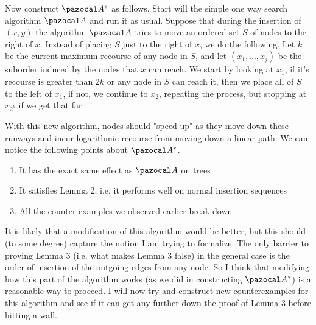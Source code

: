 \documentclass{article}
\begin{document}
Now construct $\pazocal A^*$ as follows. Start will the simple one way search algorithm $\pazocal A$ and run it as usual. Suppose that during the insertion of $(x,y)$ the algorithm $\pazocal A$ tries to move an ordered set $S$ of nodes to the right of $x$. Instead of placing $S$ just to the right of $x$, we do the following. Let $k$ be the current maximum recourse of any node in $S$, and let $(x_1,...,x_j)$ be the suborder induced by the nodes that $x$ can reach. We start by looking at $x_1$, if it's recourse is greater than $2k$ or any node in $S$ can reach it, then we place all of $S$ to the left of $x_1$, if not, we continue to $x_2$, repeating the process, but stopping at $x_{2^k}$ if we get that far.

With this new algorithm, nodes should "speed up" as they move down these runways and incur logarithmic recourse from moving down a linear path. We can notice the following points about $\pazocal A^*$.

\begin{enumerate}
    \item It has the exact same effect as $\pazocal A$ on trees
    \item It satisfies Lemma 2, i.e. it performs well on normal insertion sequences
    \item All the counter examples we observed earlier break down
\end{enumerate}

It is likely that a modification of this algorithm would be better, but this should (to some degree) capture the notion I am trying to formalize. The only barrier to proving Lemma 3 (i.e. what makes Lemma 3 false) in the general case is the order of insertion of the outgoing edges from any node. So I think that modifying how this part of the algorithm works (as we did in constructing $\pazocal A^*$) is a reasonable way to proceed. I will now try and construct new counterexamples for this algorithm and see if it can get any further down the proof of Lemma 3 before hitting a wall.
\end{document}
